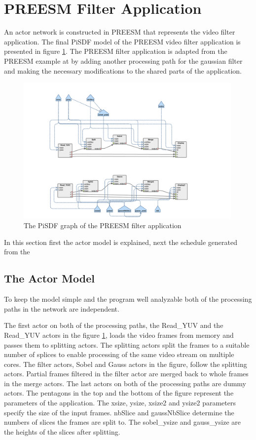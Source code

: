 \section{PREESM Filter Application}
\label{sec:preesmapp}
An actor network is constructed in PREESM that represents the video filter
application. The final PiSDF model of the PREESM video filter application is
presented in figure \ref{preesm_actors}. The PREESM filter application is
adapted from the PREESM example at \cite{preesmtut} by adding another
processing path for the gaussian filter and making the necessary modifications
to the shared parts of the application.

\begin{figure}[h!] \label{preesm_actors} \begin{center}
    \includegraphics[width=0.99\textwidth]{images/preesm_diagram.png}
    \caption{The PiSDF graph of the PREESM filter application} \end{center}
\end{figure}

In this section first the actor model is explained, next the schedule generated
from the 
\subsection{The Actor Model}
\label{subsec:actors}
To keep the model simple and the program well analyzable both of the processing
paths in the network are independent.

The first actor on both of the processing paths, the Read\_YUV and the Read\_YUV
actors in the figure \ref{preesm_actors}, loads the video frames from memory and
passes them to splitting actors. The splitting actors split the frames to a
suitable number of splices to enable processing of the same video stream on
multiple cores. The filter actors, Sobel and Gauss actors in the figure, follow
the splitting actors. Partial frames filtered in the filter actor are merged
back to whole frames in the merge actors. The last actors on both of the
processing paths are dummy actors. The pentagons in the top and the bottom of
the figure represent the parameters of the application. The xsize, ysize, xsize2
and ysize2 parameters specify the size of the input frames. nbSlice and
gaussNbSlice determine the numbers of slices the frames are split to. The
sobel\_ysize and gauss\_ysize are the heights of the slices after splitting.

